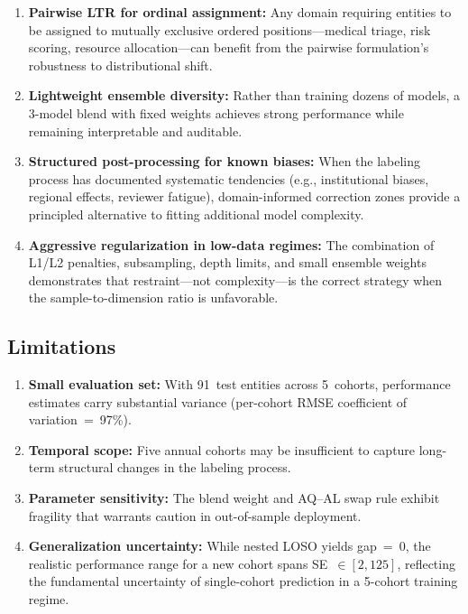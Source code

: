 \documentclass[conference]{IEEEtran}
\begin{document}
\begin{enumerate}
\item \textbf{Pairwise LTR for ordinal assignment:} Any domain requiring entities to be assigned to mutually exclusive ordered positions---medical triage, risk scoring, resource allocation---can benefit from the pairwise formulation's robustness to distributional shift.

\item \textbf{Lightweight ensemble diversity:} Rather than training dozens of models, a 3-model blend with fixed weights achieves strong performance while remaining interpretable and auditable.

\item \textbf{Structured post-processing for known biases:} When the labeling process has documented systematic tendencies (e.g., institutional biases, regional effects, reviewer fatigue), domain-informed correction zones provide a principled alternative to fitting additional model complexity.

\item \textbf{Aggressive regularization in low-data regimes:} The combination of L1/L2 penalties, subsampling, depth limits, and small ensemble weights demonstrates that restraint---not complexity---is the correct strategy when the sample-to-dimension ratio is unfavorable.
\end{enumerate}

\subsection{Limitations}

\begin{enumerate}
\item \textbf{Small evaluation set:} With 91~test entities across 5~cohorts, performance estimates carry substantial variance (per-cohort RMSE coefficient of variation~=~97\%).

\item \textbf{Temporal scope:} Five annual cohorts may be insufficient to capture long-term structural changes in the labeling process.

\item \textbf{Parameter sensitivity:} The blend weight and AQ--AL swap rule exhibit fragility that warrants caution in out-of-sample deployment.

\item \textbf{Generalization uncertainty:} While nested LOSO yields gap~=~0, the realistic performance range for a new cohort spans SE~$\in [2, 125]$, reflecting the fundamental uncertainty of single-cohort prediction in a 5-cohort training regime.
\end{enumerate}
\end{document}
